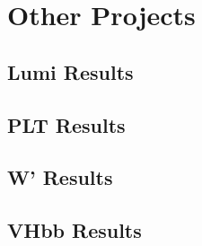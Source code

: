 \chapter{Other Projects\label{ch:pastwork}}

\section{Lumi Results\label{sec:lumi}}

\section{PLT Results\label{sec:plt}}

\section{W' Results\label{sec:wprime}}

\section{VHbb Results\label{sec:vhbb}}
